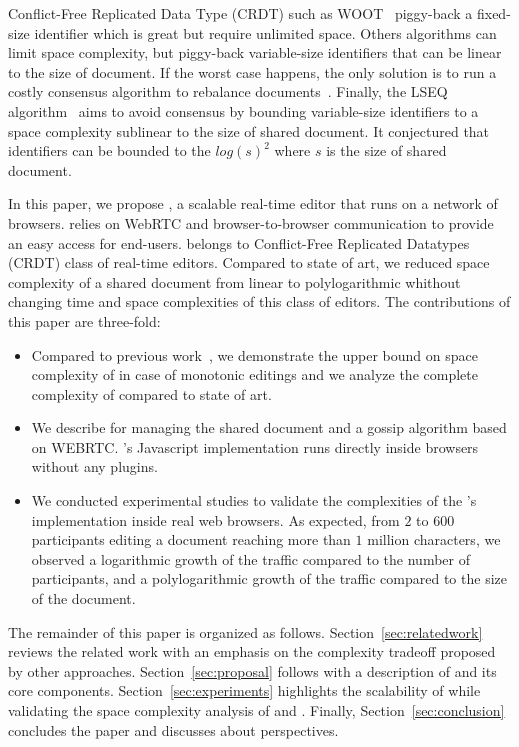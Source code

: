 Conflict-Free Replicated Data Type
(CRDT)\cite{shapiro2011comprehensive} such as
WOOT~\cite{oster2006data} piggy-back a fixed-size identifier which is
great but require unlimited space. Others algorithms can limit space
complexity, but piggy-back variable-size identifiers that can be linear to
the size of
document\cite{weiss2010logootundo,preguica2009commutative}. If the
worst case happens, the only solution is to run a costly consensus
algorithm to rebalance documents~\cite{zawirskiasynchronous}. Finally,
the LSEQ algorithm~\cite{nedelec2013concurrency} aims to avoid consensus
by bounding variable-size identifiers to a space complexity sublinear
to the size of shared document. It conjectured that identifiers can be
bounded to the $log(s)^2$ where $s$ is the size of shared document.

In this paper, we propose \CRATE, a scalable real-time editor that
runs on a network of browsers. \CRATE relies on WebRTC and
browser-to-browser communication to provide an easy access for
end-users. \CRATE belongs to Conflict-Free Replicated Datatypes (CRDT)
class of real-time editors. Compared to state of art, we reduced space
complexity of a shared document from linear to polylogarithmic
whithout changing time and space complexities of this class of editors.
 The contributions of this paper are three-fold:
\begin{itemize}
\item Compared to previous work~\cite{nedelec2013lseq}, we demonstrate
  the upper bound on space complexity of \LSEQ in case of monotonic
  editings and we analyze the complete complexity of \CRATE compared
  to state of art.
\item We describe \LSEQ for managing the shared document
  and \SPRAY a gossip algorithm based on WEBRTC. \CRATE's Javascript
  implementation runs directly inside browsers without any plugins.
\item We conducted experimental studies to validate the complexities of the
  \CRATE's implementation inside real web browsers. As expected, from $2$ to $600$
  participants editing a document reaching more than $1$ million characters, we
  observed a logarithmic growth of the traffic compared to the number of
  participants, and a polylogarithmic growth of the traffic compared to the size
  of the document.
\end{itemize}

The remainder of this paper is organized as
follows. Section~\ref{sec:relatedwork} reviews the related work with an emphasis
on the complexity tradeoff proposed by other
approaches. Section~\ref{sec:proposal} follows with a description of \CRATE and
its core components. Section~\ref{sec:experiments} highlights the scalability of
\CRATE while validating the space complexity analysis of \LSEQ and
\SPRAY. Finally, Section~\ref{sec:conclusion} concludes the paper and discusses
about perspectives.

